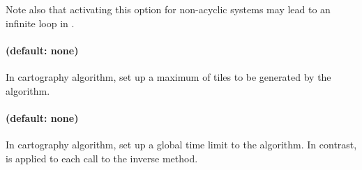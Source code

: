 Note also that activating this option for non-acyclic systems may lead to an infinite loop in \imitator{}.


\paragraph{ (default: none)}

In cartography algorithm, set up a maximum of tiles to be generated by the algorithm.


\paragraph{ (default: none)}

In cartography algorithm, set up a global time limit to the algorithm.
In contrast,  is applied to each call to the inverse method.


%
%
%
%
%


